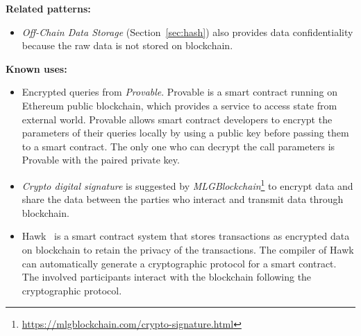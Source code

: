 
\vspace{0.5em}\noindent \textbf{Related patterns:}
\begin{itemize}
    \item \textit{Off-Chain Data Storage} (Section~\ref{sec:hash}) also provides data confidentiality because the raw data is not stored on blockchain.
\end{itemize}

\vspace{0.5em}\noindent \textbf{Known uses:}
\begin{itemize}
  \item Encrypted queries from \textit{Provable}. Provable is a smart contract running on Ethereum public blockchain, which provides a service to access state from external world. Provable allows smart contract developers to encrypt the parameters of their queries locally by using a public key before passing them to a smart contract. The only one who can decrypt the call parameters is Provable with the paired private key. 
  
  \item \textit{Crypto digital signature} is suggested by \textit{MLGBlockchain}\footnote{\url{https://mlgblockchain.com/crypto-signature.html}} to encrypt data and share the data between the parties who interact and transmit data through blockchain. %
  
  \item Hawk~\cite{Hawk} is a smart contract system that stores transactions as encrypted data on blockchain to retain the privacy of the transactions. The compiler of Hawk can automatically generate a cryptographic protocol for a smart contract. The involved participants interact with the blockchain following the cryptographic protocol. 
\end{itemize}


